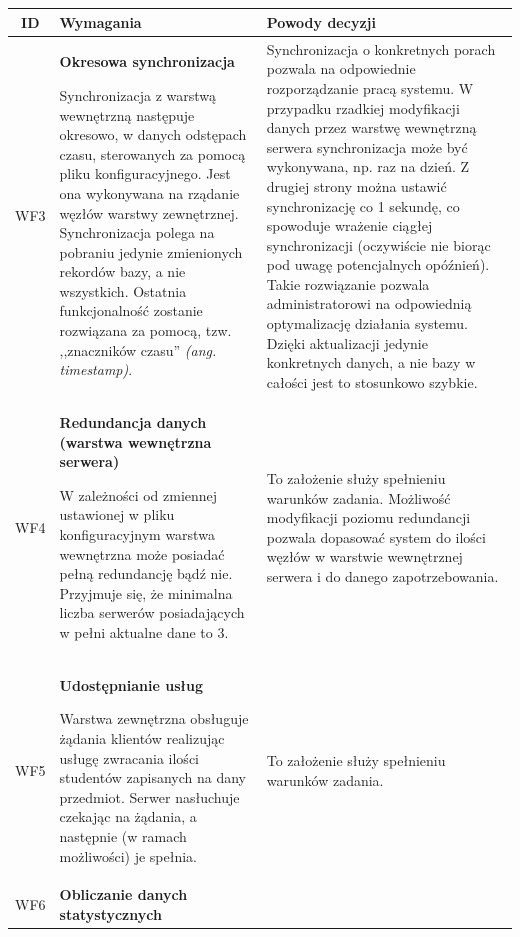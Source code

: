 {\begin{tabularx}{\textwidth}{|c|X|X|}
\end{tabularx}
\newpage
\begin{tabularx}{\textwidth}{|c|X|X|}
\hline
\textbf{ID} & \textbf{Wymagania}  & \textbf{Powody decyzji} \\
\hline

\label{z:WF3} WF3 & \textbf{Okresowa synchronizacja}

 Synchronizacja z warstwą wewnętrzną następuje okresowo, w danych odstępach czasu, sterowanych za pomocą pliku konfiguracyjnego. Jest ona wykonywana na rządanie węzłów warstwy zewnętrznej. Synchronizacja polega na pobraniu jedynie zmienionych rekordów bazy, a nie wszystkich. Ostatnia funkcjonalność zostanie rozwiązana za pomocą, tzw. ,,znaczników czasu'' \textit{(ang. timestamp)}. & Synchronizacja o konkretnych porach pozwala na odpowiednie rozporządzanie pracą systemu. W przypadku rzadkiej modyfikacji danych przez warstwę wewnętrzną serwera synchronizacja może być wykonywana, np. raz na dzień. Z drugiej strony można ustawić synchronizację co 1 sekundę, co spowoduje wrażenie ciągłej synchronizacji (oczywiście nie biorąc pod uwagę potencjalnych opóźnień). Takie rozwiązanie pozwala administratorowi na odpowiednią optymalizację działania systemu. Dzięki aktualizacji jedynie konkretnych danych, a nie bazy w całości jest to stosunkowo szybkie. \\
\hline

\label{z:WF4} WF4 & \textbf{Redundancja danych (warstwa wewnętrzna serwera)}

W zależności od zmiennej ustawionej w pliku konfiguracyjnym warstwa wewnętrzna może posiadać pełną redundancję bądź nie. Przyjmuje się, że minimalna liczba serwerów posiadających w pełni aktualne dane to 3. & To założenie służy spełnieniu warunków zadania. Możliwość modyfikacji poziomu redundancji pozwala dopasować system do ilości węzłów w warstwie wewnętrznej serwera i do danego zapotrzebowania.\\
\hline

\label{z:WF5} WF5 & \textbf{Udostępnianie usług }

 Warstwa zewnętrzna obsługuje żądania klientów realizując usługę zwracania ilości studentów zapisanych na dany przedmiot. Serwer nasłuchuje czekając na żądania, a następnie (w ramach możliwości) je spełnia. & To założenie służy spełnieniu warunków zadania. \\
\hline



\label{z:WF6} WF6 & \textbf{Obliczanie danych statystycznych }


\end{tabularx}}
